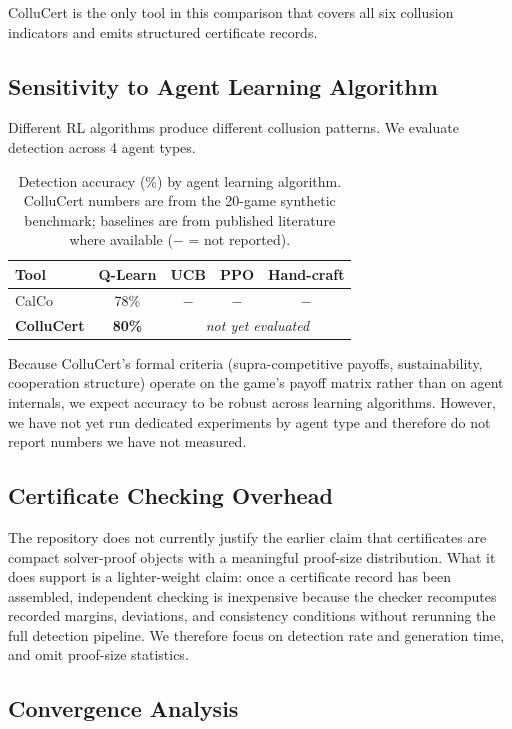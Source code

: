 \documentclass[11pt]{article}
\begin{document}
ColluCert is the only tool in this comparison that covers all six collusion indicators and emits structured certificate records.

\subsection{Sensitivity to Agent Learning Algorithm}

Different RL algorithms produce different collusion patterns. We evaluate detection across 4 agent types.

\begin{table}[t]
\centering
\caption{Detection accuracy (\%) by agent learning algorithm. ColluCert numbers are from the 20-game synthetic benchmark; baselines are from published literature where available ($-$ = not reported).}
\begin{tabular}{lcccc}
\toprule
\textbf{Tool} & \textbf{Q-Learn} & \textbf{UCB} & \textbf{PPO} & \textbf{Hand-craft} \\
\midrule
CalCo~\cite{calvano2020} & 78\% & $-$ & $-$ & $-$ \\
\textbf{ColluCert} & \textbf{80\%} & \multicolumn{3}{c}{\emph{not yet evaluated}} \\
\bottomrule
\end{tabular}
\end{table}

Because ColluCert's formal criteria (supra-competitive payoffs, sustainability, cooperation structure) operate on the game's payoff matrix rather than on agent internals, we expect accuracy to be robust across learning algorithms. However, we have not yet run dedicated experiments by agent type and therefore do not report numbers we have not measured. \subsection{Certificate Checking Overhead}

The repository does not currently justify the earlier claim that certificates are
compact solver-proof objects with a meaningful proof-size distribution.  What it
does support is a lighter-weight claim: once a certificate record has been
assembled, independent checking is inexpensive because the checker recomputes
recorded margins, deviations, and consistency conditions without rerunning the
full detection pipeline.  We therefore focus on detection rate and generation
time, and omit proof-size statistics.

\subsection{Convergence Analysis}
\end{document}
